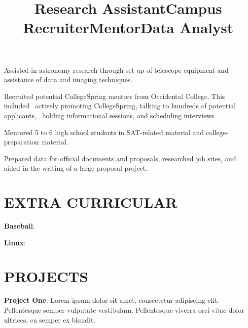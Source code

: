 \documentclass[margin]{res}
\begin{document}
\begin{resume}
\title{\textbf{Research Assistant}}
\begin{position}
	Assisted in astronomy research through set up of telescope equipment and assistance of data and imaging techniques.
\end{position}

\title{\textbf{Campus Recruiter}}
\begin{position}
	Recruited potential CollegeSpring mentors from Occidental College. This included 
actively promoting CollegeSpring, talking to hundreds of potential applicants, 
holding informational sessions, and scheduling interviews.
\end{position}

\title{\textbf{Mentor}}
\begin{position}
	Mentored 5 to 6 high school students in SAT-related material and college-preparation material.
\end{position}

\title{\textbf{Data Analyst}}
\begin{position}
	Prepared data for official documents and proposals, researched job sites, and aided in the writing of a large proposal project.
\end{position}

\section{EXTRA CURRICULAR}
\par
\textbf{Baseball}:
\par
\textbf{Linux}:

\section{PROJECTS}
\par
\textbf{Project One}: 
Lorem ipsum dolor sit amet, consectetur adipiscing elit. Pellentesque semper 
vulputate vestibulum. Pellentesque viverra orci vitae dolor ultrices, eu semper 
ex blandit. 


\end{resume}
\end{document}
